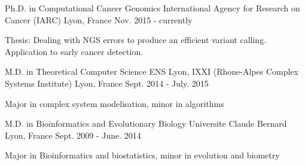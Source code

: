 

\begin{cventries}

      \cventry
    {Ph.D. in Computational Cancer Genomics} %
    {International Agency for Research on Cancer (IARC)} %
    {Lyon, France} %
    {Nov. 2015 - currently} %
    {
      \begin{cvitems} %
        \item {Thesis: Dealing with NGS errors to produce an efficient variant calling. Application to early cancer detection.}
      \end{cvitems}
    }
    
      \cventry
    {M.D. in Theoretical Computer Science} %
    {ENS Lyon, IXXI (Rhone-Alpes Complex Systems Institute) } %
    {Lyon, France} %
    {Sept. 2014 - July. 2015} %
    {
      \begin{cvitems} %
        \item {Major in complex system modelisation, minor in algorithms}
      \end{cvitems}
    }
    
    \cventry
    {M.D. in Bioinformatics and Evolutionary Biology} %
    {Universite Claude Bernard } %
    {Lyon, France} %
    {Sept. 2009 - June. 2014} %
    {
      \begin{cvitems} %
        \item {Major in Bioinformatics and biostatistics, minor in evolution and biometry}
      \end{cvitems}
    }

\end{cventries}
